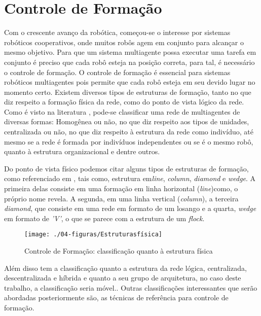 \section{Controle de Formação}
\label{sec:controleFormacao}
Com o crescente avanço da robótica, começou-se o interesse por sistemas robóticos cooperativos, onde muitos robôs agem em conjunto para alcançar o mesmo objetivo. Para que um sistema multiagente possa executar uma tarefa em conjunto é preciso que cada robô esteja na posição correta, para tal, é necessário o controle de formação. O controle de formação é essencial para sistemas robóticos multiagentes pois permite que cada robô esteja em seu devido lugar no momento certo. Existem diversos tipos de estruturas de formação, tanto no que diz respeito a formação física da rede, como do ponto de vista lógico da rede. Como é visto na literatura \cite{leal2009reconfigurable}, pode-se classificar uma rede de multiagentes de diversas formas: Homogênea ou não, no que diz respeito aos tipos de unidades, centralizada ou não, no que diz respeito à estrutura da rede como indivíduo, até mesmo se a rede é formada por indivíduos independentes ou se é o mesmo robô, quanto à estrutura organizacional e dentre outros. 

Do ponto de vista físico podemos citar alguns tipos de estruturas de formação, como referenciado em , tais como, estrutura em\emph{line}, \emph{column}, \emph{diamond} e \emph{wedge}. A primeira delas consiste em uma formação em linha horizontal (\emph{line})como, o próprio nome revela. A segunda, em uma linha vertical (\emph{column}), a terceira \emph{diamond}, que consiste em uma rede em formato de um losango e a quarta, \emph{wedge} em formato de \emph{'V'}, o que se parece com a estrutura de um \emph{flock}. 

\begin{figure}[!htb]
	\centering
	\texttt{[image: ./04-figuras/Estruturasfísica]}
	\caption{Controle de Formação: classificação quanto à estrutura física}	
	\label{fig:est_fis}
\end{figure}

Além disso tem a classificação quanto a estrutura da rede lógica, centralizada, descentralizada e híbrida e quanto a seu grupo de arquitetura, no caso deste trabalho, a classificação seria móvel.\cite{leal2009reconfigurable}. Outras classificações interessantes que serão abordadas posteriormente são, as técnicas de referência para controle de formação.

